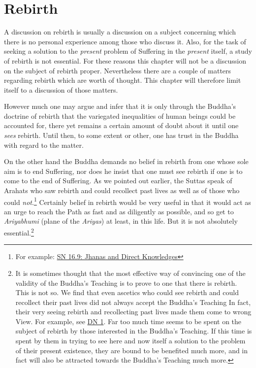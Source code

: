 \chapter{Rebirth}

A discussion on rebirth is usually a discussion on a subject concerning which there is no personal experience among those who discuss it. Also, for the task of seeking a solution to the \emph{present} problem of Suffering in the \emph{present} itself, a study of rebirth is not essential. For these reasons this chapter will not be a discussion on the subject of rebirth proper. Nevertheless there are a couple of matters regarding rebirth which are worth of thought. This chapter will therefore limit itself to a discussion of those matters.

However much one may argue and infer that it is only through the Buddha's doctrine of rebirth that the variegated inequalities of human beings could be accounted for, there yet remains a certain amount of doubt about it until one \emph{sees} rebirth. Until then, to some extent or other, one has trust in the Buddha with regard to the matter.

On the other hand the Buddha demands no belief in rebirth from one whose sole aim is to end Suffering, nor does he insist that one must see rebirth if one is to come to the end of Suffering. As we pointed out earlier, the Suttas speak of Arahats who saw rebirth and could recollect past lives as well as of those who could \emph{not}.\footnote{For example: \href{https://suttacentral.net/sn16.9/en/bodhi}{SN 16.9: Jhanas and Direct Knowledges}} Certainly belief in rebirth would be very useful in that it would act as an urge to reach the Path as fast and as diligently as possible, and so get to \textit{Ariyabhumi} (plane of the \textit{Ariyas}) at least, in this life. But it is not absolutely essential.\footnote{It is sometimes thought that the most effective way of convincing one of the validity of the Buddha's Teaching is to prove to one that there is rebirth. This is not so. We find that even ascetics who could see rebirth and could recollect their past lives did not always accept the Buddha's Teaching In fact, their very seeing rebirth and recollecting past lives made them come to wrong View. For example, see \href{https://suttacentral.net/dn1/en/bodhi}{DN 1}. Far too much time seems to be spent on the subject of rebirth by those interested in the Buddha's Teaching. If this time is spent by them in trying to see here and now itself a solution to the problem of their present existence, they are bound to be benefited much more, and in fact will also be attracted towards the Buddha's Teaching much more.}


